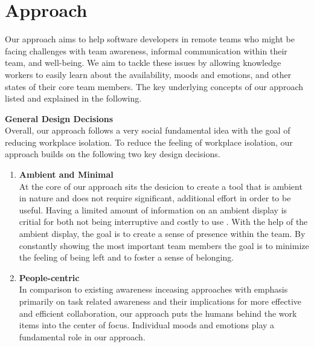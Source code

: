 \chapter{Approach}

Our approach aims to help software developers in remote teams who might be facing challenges with team awareness, informal communication within their team, and well-being. We aim to tackle these issues by allowing knowledge workers to easily learn about the availability, moods and emotions, and other states of their core team members. The key underlying concepts of our approach listed and explained in the following.

\medskip\noindent\textbf{General Design Decisions} \\
Overall, our approach follows a very social fundamental idea with the goal of reducing workplace isolation. To reduce the feeling of workplace isolation, our approach builds on the following two key design decisions.
\begin{enumerate}[itemsep=0ex, parsep=0ex, leftmargin=*]
    \item \textbf{Ambient and Minimal} \\
          At the core of our approach sits the desicion to create a tool that is ambient in nature and does not require significant, additional effort in order to be useful. Having a limited amount of information on an ambient display is critial for both not being interruptive and costly to use \autocite{dabbish2004controlling}. With the help of the ambient display, the goal is to create a sense of presence within the team. By constantly showing the most important team members the goal is to minimize the feeling of being left and to foster a sense of belonging.
    \item \textbf{People-centric} \\
          In comparison to existing awareness inceasing approaches with emphasis primarily on task related awareness and their implications for more effective and efficient collaboration, our approach puts the humans behind the work items into the center of focus. Individual moods and emotions play a fundamental role in our approach.
\end{enumerate}

